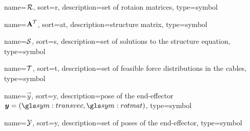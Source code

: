 	{%
		name=\ensuremath{\set{R}},
		sort=r,
		description=set of rotaion matrices,
		type=symbol
}
\newcommand{\setofrotationmatrices}{\gls{sym:setofrotationmatrices}}

	{%
		name=\ensuremath{{\mat{A}^T}},
		sort=at,
		description=structure matrix,
		type=symbol
	}
	\newcommand{\strucmat}{\gls{sym:strucmat}}

	{%
		name=\ensuremath{\set{S}},
		sort=s,
		description=set of solutions to the structure equation,
		type=symbol
	}
	\newcommand{\setsolstruceq}{\gls{sym:setsolstruceq}}

	{%
		name=\ensuremath{\set{T}},
		sort=t,
		description=set of feasible force distributions in the cables,
		type=symbol
	}
	\newcommand{\setoffeasibleforces}{\gls{sym:setoffeasibleforces}}

	{%
		name=\ensuremath{\vec{y}},
		sort=y,
		description=pose of the end-effector \ensuremath{\vec{y} = (\transvec, \rotmatbare)},
		type=symbol
	}
	\newcommand{\pose}{\gls{sym:pose}}

	{%
		name=\ensuremath{\set{Y}},
		sort=y,
		description=set of poses of the end-effector,
		type=symbol
	}
	\newcommand{\setofposes}{\gls{sym:setofposes}}

